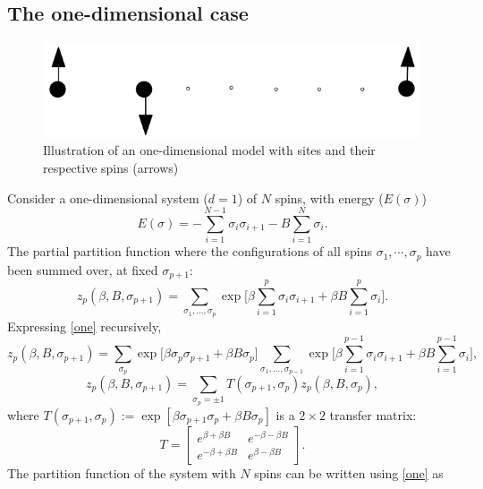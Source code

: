 \documentclass[letterpaper,english,10pt]{article}
\begin{document}
\subsection{The one-dimensional case}
\begin{figure}[hb]
\centering
\includegraphics[width=\textwidth]{Figures/oned.png}
\caption{Illustration of an one-dimensional model with sites and their respective spins (arrows)}
\end{figure}
Consider a one-dimensional system ($d=1$) of $N$ spins, with energy ($E(\sigma)$)
$$E(\sigma)=-\sum_{i=1}^{N-1}\sigma_{i}\sigma_{i+1}-B\sum_{i=1}^{N}\sigma_{i}.$$
The partial partition function where the configurations of all spins $\sigma_{1},\cdots,\sigma_{p}$ have been summed over, at fixed $\sigma_{p+1}$:
\begin{equation}
z_{p}(\beta,B,\sigma_{p+1})=\sum_{\sigma_{1},\hdots,\sigma_{p}}\exp\bigg[\beta\sum_{i=1}^{p}\sigma_{i}\sigma_{i+1}+\beta B \sum_{i=1}^{p}\sigma_{i}\bigg].
\label{one}
\end{equation}
Expressing \eqref{one} recursively,
$$z_{p}(\beta,B,\sigma_{p+1})=\sum_{\sigma_{p}}\exp\bigg[\beta \sigma_{p}\sigma_{p+1}+\beta B \sigma_{p}\bigg]\sum_{\sigma_{1},\hdots,\sigma_{p-1}}\exp\bigg[\beta\sum_{i=1}^{p-1}\sigma_{i}\sigma_{i+1}+\beta B \sum_{i=1}^{p-1}\sigma_{i}\bigg],$$
$$z_{p}(\beta,B,\sigma_{p+1})= \sum_{\sigma_{p}=\pm 1} T(\sigma_{p+1},\sigma_{p})z_{p}(\beta,B,\sigma_{p}),$$ 
where $T(\sigma_{p+1},\sigma_{p}):= \exp[\beta \sigma_{p+1} \sigma_{p}+\beta B \sigma_{p}]$ is a $2 \times 2$ transfer matrix:
$$T = 
\begin{bmatrix}
	e^{\beta+\beta B} & e^{-\beta-\beta B} \\
	e^{-\beta+\beta B} & e^{\beta-\beta B} 
	\end{bmatrix}.$$
The partition function of the system with $N$ spins can be written using \eqref{one} as
\end{document}
